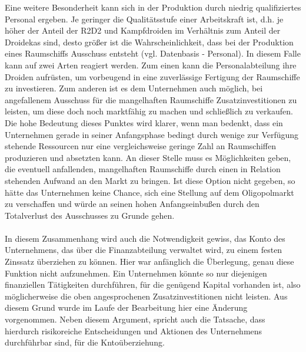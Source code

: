 Eine weitere Besonderheit kann sich in der Produktion durch niedrig qualifiziertes Personal ergeben. Je geringer die Qualitätsstufe einer Arbeitskraft ist, d.h. je höher der Anteil der R2D2 und Kampfdroiden im Verhältnis zum Anteil der Droidekas sind, desto größer ist die Wahrscheinlichkeit, dass bei der Produktion eines Raumschiffs Ausschuss entsteht (vgl. Datenbasis - Personal). In diesem Falle kann auf zwei Arten reagiert werden. Zum einen kann die Personalabteilung ihre Droiden aufrüsten, um vorbeugend in eine zuverlässige Fertigung der Raumschiffe zu investieren. Zum anderen ist es dem Unternehmen auch möglich, bei angefallenem Ausschuss für die mangelhaften Raumschiffe Zusatzinvestitionen zu leisten, um diese doch noch marktfähig zu machen und schließlich zu verkaufen. Die hohe Bedeutung dieses Punktes wird klarer, wenn man bedenkt, dass ein Unternehmen gerade in seiner Anfangsphase bedingt durch wenige zur Verfügung stehende Ressourcen nur eine vergleichsweise geringe Zahl an Raumschiffen produzieren und absetzten kann. An dieser Stelle muss es Möglichkeiten geben, die eventuell anfallenden, mangelhaften Raumschiffe durch einen in Relation stehenden Aufwand an den Markt zu bringen. Ist diese Option nicht gegeben, so hätte das Unternehmen keine Chance, sich eine Stellung auf dem Oligopolmarkt zu verschaffen und würde an seinen hohen Anfangseinbußen durch den Totalverlust des Ausschusses zu Grunde gehen. 
\\
\\
In diesem Zusammenhang wird auch die Notwendigkeit gewiss, das Konto des Unternehmens, das über die Finanzabteilung verwaltet wird, zu einem festen Zinssatz überziehen zu können. Hier war anfänglich die Überlegung, genau diese Funktion nicht aufzunehmen. Ein Unternehmen könnte so nur diejenigen finanziellen Tätigkeiten durchführen, für die genügend Kapital vorhanden ist, also möglicherweise die oben angesprochenen Zusatzinvestitionen nicht leisten. Aus diesem Grund wurde im Laufe der Bearbeitung hier eine Änderung vorgenommen.  Neben diesem Argument, spricht auch die Tatsache, dass hierdurch risikoreiche Entscheidungen und Aktionen des Unternehmens durchführbar sind, für die Kntoüberziehung.


